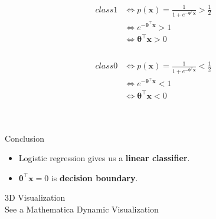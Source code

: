 \documentclass{beamer}
\begin{document}
\begin{frame}
\begin{centering}
\begin{equation}
\begin{aligned}
class 1 &\Leftrightarrow p(\mathbf{x}) = \frac{1}{1+e^{-\bm{\theta} ^ {\intercal} \mathbf{x}}} > \frac{1}{2} \\
&\Leftrightarrow e^ {-\bm{\theta} ^ {\intercal} \mathbf{x}} > 1\\
&\Leftrightarrow \bm{\theta} ^ {\intercal} \mathbf{x} > 0\\
\end{aligned}
\end{equation}
\\
\begin{equation}
\begin{aligned}
class 0 &\Leftrightarrow p(\mathbf{x}) = \frac{1}{1+e^{-\bm{\theta} ^ {\intercal} \mathbf{x}}} < \frac{1}{2} \\
&\Leftrightarrow e^ {-\bm{\theta} ^ {\intercal} \mathbf{x}} < 1\\
&\Leftrightarrow \bm{\theta} ^ {\intercal} \mathbf{x} < 0\\
\end{aligned}
\end{equation}
\end{centering}
\\
\begin{block}{Conclusion}
\begin{itemize}
\item Logistic regression gives us a \textbf{linear classifier}. \\
\item $\bm{\theta}  ^\intercal \mathbf{x} = 0$ is \textbf{decision boundary}. 
\end{itemize}
\end{block}
\end{frame}
\begin{frame}
3D Visualization \\
See a Mathematica Dynamic Visualization
\end{frame}
\end{document}
